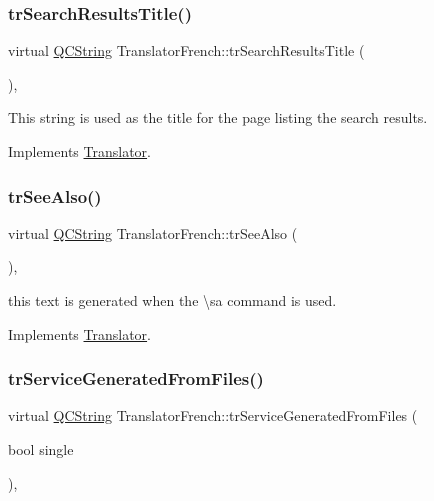 \subsubsection{\texorpdfstring{trSearchResultsTitle()}{trSearchResultsTitle()}}
{\footnotesize\ttfamily virtual \mbox{\hyperlink{class_q_c_string}{Q\+C\+String}} Translator\+French\+::tr\+Search\+Results\+Title (\begin{DoxyParamCaption}{ }\end{DoxyParamCaption})\hspace{0.3cm}{\ttfamily [inline]}, {\ttfamily [virtual]}}

This string is used as the title for the page listing the search results. 

Implements \mbox{\hyperlink{class_translator}{Translator}}.

\mbox{\label{class_translator_french_ac75b50ccc040c2b75530a0c709287c24}} 
\subsubsection{\texorpdfstring{trSeeAlso()}{trSeeAlso()}}
{\footnotesize\ttfamily virtual \mbox{\hyperlink{class_q_c_string}{Q\+C\+String}} Translator\+French\+::tr\+See\+Also (\begin{DoxyParamCaption}{ }\end{DoxyParamCaption})\hspace{0.3cm}{\ttfamily [inline]}, {\ttfamily [virtual]}}

this text is generated when the \textbackslash{}sa command is used. 

Implements \mbox{\hyperlink{class_translator}{Translator}}.

\mbox{\label{class_translator_french_a733d2815c17cb1a5581c118b80a3fdb9}} 
\subsubsection{\texorpdfstring{trServiceGeneratedFromFiles()}{trServiceGeneratedFromFiles()}}
{\footnotesize\ttfamily virtual \mbox{\hyperlink{class_q_c_string}{Q\+C\+String}} Translator\+French\+::tr\+Service\+Generated\+From\+Files (\begin{DoxyParamCaption}\item[{bool}]{single }\end{DoxyParamCaption})\hspace{0.3cm}{\ttfamily [inline]}, {\ttfamily [virtual]}}

